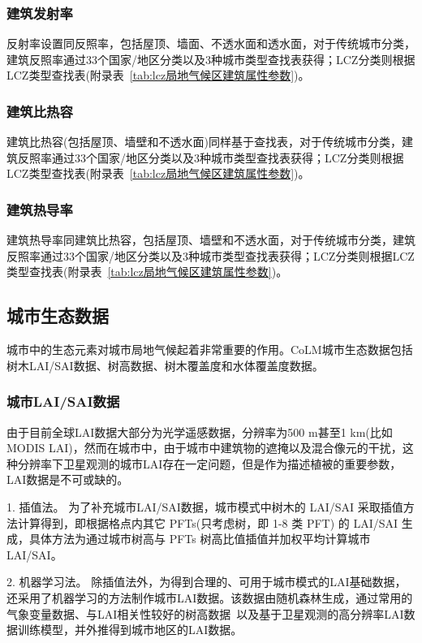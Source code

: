 \subsubsection{建筑发射率}\label{建筑发射率}
反射率设置同反照率，包括屋顶、墙面、不透水面和透水面，对于传统城市分类，建筑反照率通过33个国家/地区分类以及3种城市类型查找表获得；LCZ分类则根据LCZ类型查找表(附录表~\ref{tab:lcz局地气候区建筑属性参数})。

\subsubsection{建筑比热容}\label{建筑比热容}
建筑比热容(包括屋顶、墙壁和不透水面)同样基于查找表，对于传统城市分类，建筑反照率通过33个国家/地区分类以及3种城市类型查找表获得；LCZ分类则根据LCZ类型查找表(附录表~\ref{tab:lcz局地气候区建筑属性参数})。

\subsubsection{建筑热导率}\label{建筑热导率}
建筑热导率同建筑比热容，包括屋顶、墙壁和不透水面，对于传统城市分类，建筑反照率通过33个国家/地区分类以及3种城市类型查找表获得；LCZ分类则根据LCZ类型查找表(附录表~\ref{tab:lcz局地气候区建筑属性参数})。

\subsection{城市生态数据}\label{城市生态数据}
城市中的生态元素对城市局地气候起着非常重要的作用。CoLM城市生态数据包括树木LAI/SAI数据、树高数据、树木覆盖度和水体覆盖度数据。

\subsubsection{城市LAI/SAI数据}\label{城市LAISAI数据}
由于目前全球LAI数据大部分为光学遥感数据，分辨率为500 m甚至1 km(比如MODIS LAI)，然而在城市中，由于城市中建筑物的遮掩以及混合像元的干扰，这种分辨率下卫星观测的城市LAI存在一定问题，但是作为描述植被的重要参数，LAI数据是不可或缺的。

1. 插值法\label{插值法LAI}。
为了补充城市LAI/SAI数据，城市模式中树木的 LAI/SAI 采取插值方法计算得到，即根据格点内其它 PFTs(只考虑树，即 1-8 类 PFT) 的 LAI/SAI 生成，具体方法为通过城市树高与 PFTs 树高比值插值并加权平均计算城市 LAI/SAI。

2. 机器学习法\label{机器学习法LAI}。
除插值法外，为得到合理的、可用于城市模式的LAI基础数据，还采用了机器学习的方法制作城市LAI数据。该数据由随机森林生成，通过常用的气象变量数据\citep{fick2017worldclim}、与LAI相关性较好的树高数据~\citep{lang2023high}以及基于卫星观测的高分辨率LAI数据\citep{lin2023ReprocessedMODISVersion}训练模型，并外推得到城市地区的LAI数据。
%
